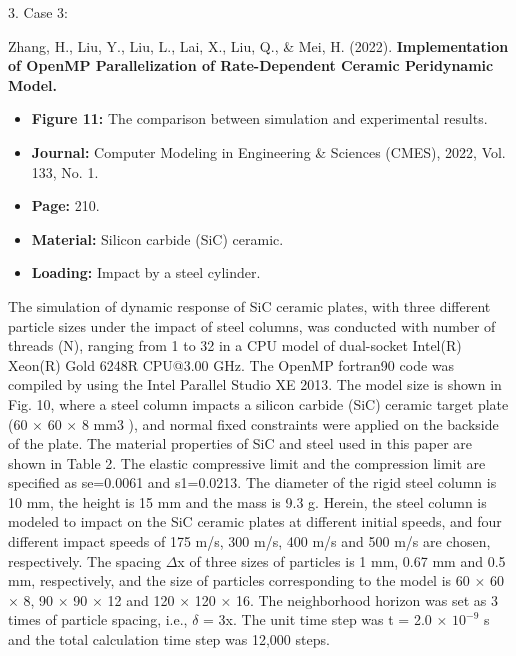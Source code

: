 \documentclass[11pt]{article}
\begin{document}
3. Case 3:

Zhang, H., Liu, Y., Liu, L., Lai, X., Liu, Q., \& Mei, H. (2022). \textbf{Implementation of OpenMP Parallelization of Rate-Dependent Ceramic Peridynamic Model.}


\begin{itemize}
\item
  \textbf{Figure 11:} The comparison between simulation and experimental results.
\item
  \textbf{Journal:} Computer Modeling in Engineering \& Sciences (CMES), 2022, Vol. 133, No. 1.
\item
  \textbf{Page:} 210.
\item
  \textbf{Material:} Silicon carbide (SiC) ceramic.
\item
  \textbf{Loading:} Impact by a steel cylinder.
\end{itemize}

The simulation of dynamic response of SiC ceramic plates, with three different particle sizes under the impact of steel columns, was conducted with number of threads (N), ranging from 1 to 32 in a CPU model of dual-socket Intel(R) Xeon(R) Gold 6248R CPU@3.00 GHz. The OpenMP fortran90 code was compiled by using the Intel Parallel Studio XE 2013. The model size is shown in Fig. 10, where a steel column impacts a silicon carbide (SiC) ceramic target plate (60 \(\times\) 60 \(\times\) 8 mm3 ), and normal fixed constraints were applied on the backside of the plate. The material properties of SiC and steel used in this paper are shown in Table 2. The elastic compressive limit and the compression limit are specified as se=0.0061 and s1=0.0213. The diameter of the rigid steel column is 10 mm, the height is 15 mm and the mass is 9.3 g. Herein, the steel column is modeled to impact on the SiC ceramic plates at different initial speeds, and four different impact speeds of 175 m/s, 300 m/s, 400 m/s and 500 m/s are chosen, respectively. The spacing \(\Delta\)x of three sizes of particles is 1 mm, 0.67 mm and 0.5 mm, respectively, and the size of particles corresponding to the model is 60 \(\times\) 60 \(\times\) 8, 90 \(\times\) 90 \(\times\) 12 and 120 \(\times\) 120 \(\times\) 16. The neighborhood horizon was set as 3 times of particle spacing, i.e., \(\delta\) = 3x. The unit time step was t = 2.0 \(\times\) \(10^{-9}\) s and the total calculation time step was 12,000 steps.
\end{document}
